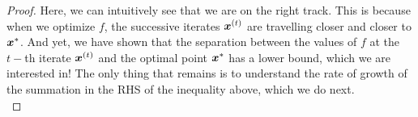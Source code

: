 \documentclass{article}
\begin{document}
\begin{proof}
Here, we can intuitively see that we are on the right track.
This is because when we optimize $f$, the successive iterates ${\bm{x}}^{(t)}$ are travelling closer and closer to ${\bm{x}}^{\ast}$. 
And yet, we have shown that the separation between the values of $f$ at the $t-$th iterate ${\bm{x}}^{(t)}$ and the optimal point ${\bm{x}}^{\ast}$ has a lower bound, which we are interested in! 
The only thing that remains is to understand the rate of growth of the summation in the RHS of the inequality above, which we do next.\\
    


\end{proof}
\end{document}
